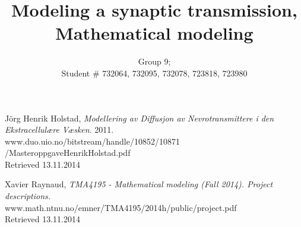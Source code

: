 \documentclass[9pt]{extarticle}
\title{Modeling a synaptic transmission, \\
Mathematical modeling}
\author{Group 9; \\
Student \# 732064, 732095, 732078, 723818, 723980 }
\begin{document}
\maketitle













%




\begin{thebibliography}{9}

  Jörg Henrik Holstad,
  \emph{Modellering av Diffusjon av Nevrotransmittere
i den Ekstracellulære Væsken}.
  2011.\\
www.duo.uio.no/bitstream/handle/10852/10871\\
/MasteroppgaveHenrikHolstad.pdf \\
Retrieved 13.11.2014


	Xavier Raynaud,
	\emph{TMA4195 - Mathematical modeling (Fall 2014).
Project descriptions.}\\
www.math.ntnu.no/emner/TMA4195/2014h/public/project.pdf\\
Retrieved 13.11.2014


\end{thebibliography}
\end{document}
